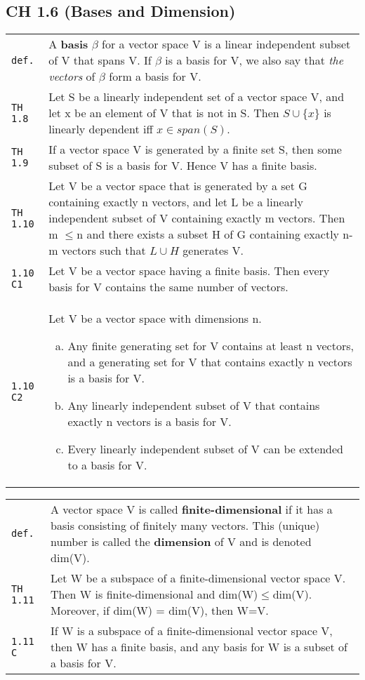 \documentclass[10pt,landscape]{article}
\begin{document}
\begin{multicols}{3}
\section{CH 1.6 (Bases and Dimension)}
\begin{tabular}{@{}p{\the\MyLen}%
                @{}p{\linewidth-\the\MyLen}@{}} %
\verb!def.! & A \textbf{basis} $\beta$ for a vector space V is a linear independent subset of V that spans V. If $\beta$ is a basis for V, we also say that \textit{the vectors} of $\beta$ form a basis for V.\\
\verb!TH 1.8! & Let S be a linearly independent set of a vector space V, and let x be an element of V that is not in S. Then $S\cup \{x\}$ is linearly dependent iff $x\in\! span(S)$.\\
\verb!TH 1.9! & If a vector space V is generated by a finite set S, then some subset of S is a basis for V. Hence V has a finite basis.\\
\verb!TH 1.10! & Let V be a vector space that is generated by a set G containing exactly n vectors, and let L be a linearly independent subset of V containing exactly m vectors. Then m $\leq$n and there exists a subset H of G containing exactly n-m vectors such that $L\cup H$ generates V.\\
\verb!1.10 C1! & Let V be a vector space having a finite basis. Then every basis for V contains the same number of vectors.\\
\verb!1.10 C2! & Let V be a vector space with dimensions n.
			\begin{enumerate}[a)]
			\item Any finite generating set for V contains at least n vectors, and a generating set for V that contains exactly n vectors is a basis for V.
			\item Any linearly independent subset of V that contains exactly n vectors is a basis for V.
			\item Every linearly independent subset of V can be extended to a basis for V.
			\end{enumerate}\\
\end{tabular}
\begin{tabular}{@{}p{\the\MyLen}%
                @{}p{\linewidth-\the\MyLen}@{}} %
\verb!def.! & A vector space V is called \textbf{finite-dimensional} if it has a basis consisting of finitely many vectors. This (unique) number is called the \textbf{dimension} of V and is denoted dim(V).\\
\verb!TH 1.11! & Let W be a subspace of a finite-dimensional vector space V. Then W is finite-dimensional and dim(W)$\leq$dim(V). Moreover, if dim(W) = dim(V), then W=V.\\
\verb!1.11 C! & If W is a subspace of a finite-dimensional vector space V, then W has a finite basis, and any basis for W is a subset of a basis for V.
\end{tabular}


\end{multicols}
\end{document}
